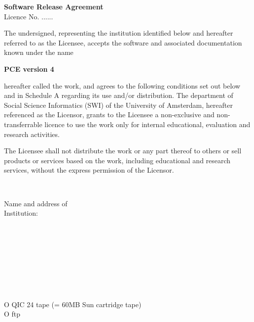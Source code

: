 \oddsidemargin  1cm
\evensidemargin 1cm
\marginparwidth 0pt
\topmargin 0pt
\headheight 0pt
\headsep 0pt
\footheight 12pt
\footskip 30pt
\textwidth 6in
\textheight 9in
\setlength{\parindent}{0in}
\setlength{\parskip}{5pt}
\nofiles

\begin{center}
    { \Large \bf Software Release Agreement } \\
    \vspace{1cm}
    { Licence No. ...... }
    \vspace{1.5cm}
\end{center}

The undersigned, representing the institution identified below and
hereafter referred to as the Licensee, accepts the software and
associated documentation known under the name

\vspace{5mm}
\centerline{\Large \bf PCE version 4}
\vspace{5mm}

hereafter called the work, and agrees to the following conditions set
out below and in Schedule A regarding its use and/or distribution. The
department of Social Science Informatics (SWI) of the University of
Amsterdam, hereafter referenced as the Licensor, grants to the Licensee
a non-exclusive and non-transferrable licence to use the work only for
internal educational, evaluation and research activities.

The Licensee shall not distribute the work or any part thereof to
others or sell products or services based on the work, including
educational and research services, without the express permission of the
Licensor.

\newlength{\tag}
\settowidth{\tag}{Authorised Signature: }
\newlength{\rest}
\setlength{\rest}{\textwidth}
\addtolength{\rest}{-\tag}

\newcommand{\fillin}{\dotfill\mbox{}}
\newcommand{\onlydots}{\mbox{}\fillin}
\newcommand{\next}{\\[3mm]}

\vspace{0.5cm}
\fillin \next
\parbox[t]{\tag}{Name and address of \\ Institution:}%
\parbox[t]{\rest}{\onlydots \next \onlydots \next \onlydots} \next
{}\fillin \next
{}\fillin \next
{}\fillin \next
{}\fillin \next
{}O QIC 24 tape (= 60MB Sun cartridge tape) \\
\makebox[\tag][l]{\mbox{}}O ftp
\next \vspace{0.3cm}

